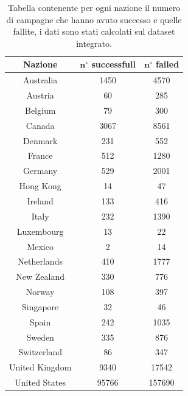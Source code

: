 \begin{table}
	\caption{Tabella contenente per ogni nazione il numero di campagne che hanno avuto successo e quelle fallite, i dati sono stati calcolati sul dataset integrato.}
	
	\label{tab:prj_succ_nosucc}
	
	\centering
	\begin{tabular}{|c|c|c|}
		\hline
		\textbf{Nazione} & \textbf{$\mathbf{n^{\circ}}$ successfull} & \textbf{$\mathbf{n^{\circ}}$ failed}\\ \hline
		Australia            &1450
&4570 \\ \hline
		Austria              &60
&285 \\ \hline
		Belgium              &79
&300 \\ \hline
		Canada               &3067
&8561 \\ \hline
		Denmark              &231
&552 \\ \hline
		France               &512
&1280 \\ \hline 
		Germany              &529
&2001 \\ \hline
		Hong Kong            &14
&47 \\ \hline
		Ireland              &133
&416 \\ \hline
		Italy                &232
&1390 \\ \hline
		Luxembourg           &13
&22 \\ \hline
		Mexico               &2
&14 \\ \hline
		Netherlands          &410
&1777 \\ \hline
		New Zealand          &330
&776 \\ \hline
		Norway               &108
&397 \\ \hline
		Singapore            &32
&46 \\ \hline
		Spain                &242
&1035 \\ \hline
		Sweden               &335
&876 \\ \hline
		Switzerland          &86
&347 \\ \hline
		United Kingdom       &9340
&17542 \\ \hline
		United States        &95766 &157690 \\ \hline
	\end{tabular}
\end{table}
\newpage
